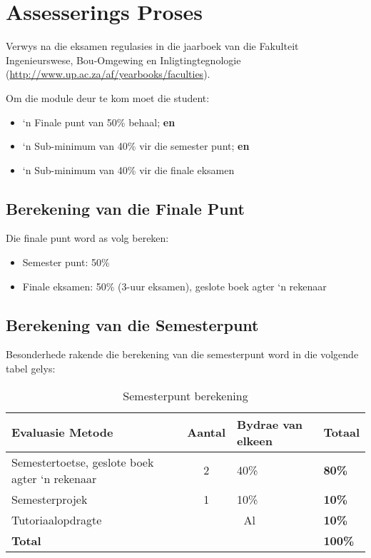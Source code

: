 \section{Assesserings Proses}
    Verwys na die eksamen regulasies in die jaarboek van die Fakulteit
    Ingenieurswese, Bou-Omgewing en Inligtingtegnologie
    (\url{http://www.up.ac.za/af/yearbooks/faculties}).

    \noindent
    Om die module deur te kom moet die student:
    \begin{itemize}
        \item `n Finale punt van 50\% behaal; {\bf en}
        \item `n Sub-minimum van 40\% vir die semester punt; {\bf en}
        \item `n Sub-minimum van 40\% vir die finale eksamen
    \end{itemize}

    \subsection{Berekening van die Finale Punt}
        Die finale punt word as volg bereken:
        \begin{itemize}
            \item Semester punt: 50\%
            \item Finale eksamen: 50\% (3-uur eksamen), geslote boek
              agter `n rekenaar
        \end{itemize}

    \subsection{Berekening van die Semesterpunt}
        Besonderhede rakende die berekening van die semesterpunt word in die
        volgende tabel gelys:
        \begin{table}[!h]
            \begin{center}
             \begin{tabular}{|p{5cm}|c|l|l|}
               \hline
               {\bf Evaluasie Metode} & {\bf Aantal} &
               {\bf Bydrae van elkeen} & {\bf Totaal} \\
               \hline
               Semestertoetse, geslote boek
               agter `n rekenaar
               & 2 & 40\% & {\bf 80\%} \\ \hline
               Semesterprojek
               & 1 & 10\% & {\bf 10\%} \\ \hline
               Tutoriaalopdragte
               & \multicolumn{2}{|c|}{Al} & {\bf 10\%} \\
               \hline
               \multicolumn{3}{|l|}{{\bf Total}} & {\bf 100\%} \\
               \hline
             \end{tabular}
             \caption{Semesterpunt berekening}
            \end{center}
        \end{table}

